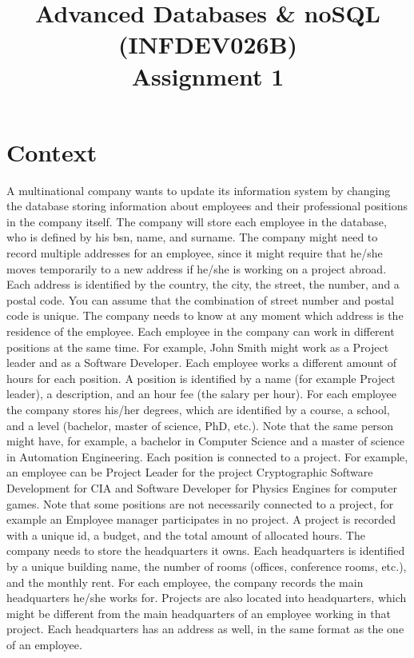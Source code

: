 \documentclass[10pt,a4paper]{article}
\title{Advanced Databases \& noSQL (INFDEV026B) \\ Assignment 1}
\author { }
\date { }
\begin{document}
\maketitle

\section*{Context}
A multinational company wants to update its information system by changing the database storing information about employees and their professional positions in the company itself. 
The company will store each employee in the database, who is defined by his bsn, name, and surname. 
The company might need to record multiple addresses for an employee, since it might require that he/she moves temporarily to a new address if he/she is working on a project abroad. Each address is identified by the country, the city, the street, the number, and a postal code. You can assume that the combination of street number and postal code is unique. The company needs to know at any moment which address is the residence of the employee.
Each employee in the company can work in different positions at the same time. For example, John Smith might work as a Project leader and as a Software Developer. Each employee works a different amount of hours for each position. A position is identified by a name (for example Project leader), a description, and an hour fee (the salary per hour).
For each employee the company stores his/her degrees, which are identified by a course, a school, and a level (bachelor, master of science, PhD, etc.). Note that the same person might have, for example, a bachelor in Computer Science and a master of science in Automation Engineering.
Each position is connected to a project. For example, an employee can be Project Leader for the project Cryptographic Software Development for CIA and Software Developer for Physics Engines for computer games. Note that some positions are not necessarily connected to a project, for example an Employee manager participates in no project. A project is recorded with a unique id, a budget, and the total amount of allocated hours.
The company needs to store the headquarters it owns. Each headquarters is identified by a unique building name, the number of rooms (offices, conference rooms, etc.), and the monthly rent. For each employee, the company records the main headquarters he/she works for. Projects are also located into headquarters, which might be different from the main headquarters of an employee working in that project. Each headquarters has an address as well, in the same format as the one of an employee.
\end{document}
